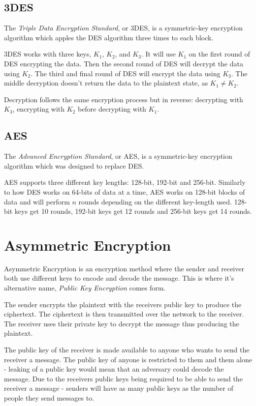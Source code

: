 \subsection{3DES}
The \textit{Triple Data Encryption Standard}, or 3DES, is a symmetric-key encryption algorithm which apples the DES algorithm three times to each block. 

3DES works with three keys, $K_1$, $K_2$, and $K_3$. It will use $K_1$ on the first round of DES encrypting the data. Then the second round of DES will decrypt the data using $K_2$. The third and final round of DES will encrypt the data using $K_3$. The middle decryption doesn't return the data to the plaintext state, as $K_1 \neq K_2$. 

Decryption follows the same encryption process but in reverse: decrypting with $K_3$, encrypting with $K_2$ before decrypting with $K_1$. 

\subsection{AES}
The \textit{Advanced Encryption Standard}, or AES, is a symmetric-key encryption algorithm which was designed to replace DES.

AES supports three different key lengths: 128-bit, 192-bit and 256-bit. Similarly to how DES works on 64-bits of data at a time, AES works on 128-bit blocks of data and will perform $n$ rounds depending on the different key-length used. 128-bit keys get 10 rounds, 192-bit keys get 12 rounds and 256-bit keys get 14 rounds. 

\section{Asymmetric Encryption}
Asymmetric Encryption is an encryption method where the sender and receiver both use different keys to encode and decode the message. This is where it's alternative name, \textit{Public Key Encryption} comes form.

The sender encrypts the plaintext with the receivers public key to produce the ciphertext. The ciphertext is then transmitted over the network to the receiver. The receiver uses their private key to decrypt the message thus producing the plaintext. 

The public key of the receiver is made available to anyone who wants to send the receiver a message. The public key of anyone is restricted to them and them alone - leaking of a public key would mean that an adversary could decode the message. Due to the receivers public keys being required to be able to send the receiver a message - senders will have as many public keys as the number of people they send messages to.

